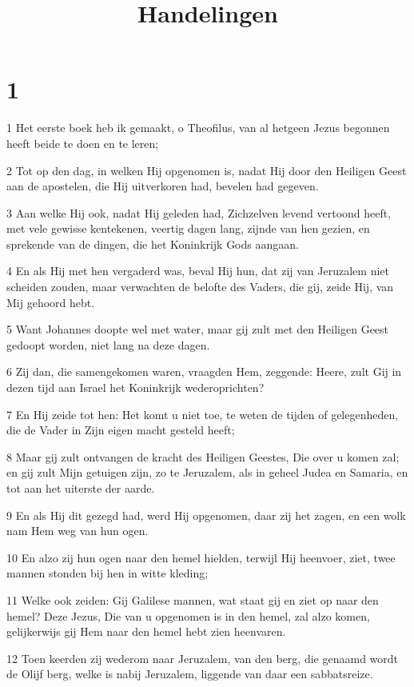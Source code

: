 

\title{Handelingen}



\chapter{1}

\par 1 Het eerste boek heb ik gemaakt, o Theofilus, van al hetgeen Jezus begonnen heeft beide te doen en te leren;
\par 2 Tot op den dag, in welken Hij opgenomen is, nadat Hij door den Heiligen Geest aan de apostelen, die Hij uitverkoren had, bevelen had gegeven.
\par 3 Aan welke Hij ook, nadat Hij geleden had, Zichzelven levend vertoond heeft, met vele gewisse kentekenen, veertig dagen lang, zijnde van hen gezien, en sprekende van de dingen, die het Koninkrijk Gods aangaan.
\par 4 En als Hij met hen vergaderd was, beval Hij hun, dat zij van Jeruzalem niet scheiden zouden, maar verwachten de belofte des Vaders, die gij, zeide Hij, van Mij gehoord hebt.
\par 5 Want Johannes doopte wel met water, maar gij zult met den Heiligen Geest gedoopt worden, niet lang na deze dagen.
\par 6 Zij dan, die samengekomen waren, vraagden Hem, zeggende: Heere, zult Gij in dezen tijd aan Israel het Koninkrijk wederoprichten?
\par 7 En Hij zeide tot hen: Het komt u niet toe, te weten de tijden of gelegenheden, die de Vader in Zijn eigen macht gesteld heeft;
\par 8 Maar gij zult ontvangen de kracht des Heiligen Geestes, Die over u komen zal; en gij zult Mijn getuigen zijn, zo te Jeruzalem, als in geheel Judea en Samaria, en tot aan het uiterste der aarde.
\par 9 En als Hij dit gezegd had, werd Hij opgenomen, daar zij het zagen, en een wolk nam Hem weg van hun ogen.
\par 10 En alzo zij hun ogen naar den hemel hielden, terwijl Hij heenvoer, ziet, twee mannen stonden bij hen in witte kleding;
\par 11 Welke ook zeiden: Gij Galilese mannen, wat staat gij en ziet op naar den hemel? Deze Jezus, Die van u opgenomen is in den hemel, zal alzo komen, gelijkerwijs gij Hem naar den hemel hebt zien heenvaren.
\par 12 Toen keerden zij wederom naar Jeruzalem, van den berg, die genaamd wordt de Olijf berg, welke is nabij Jeruzalem, liggende van daar een sabbatsreize.
